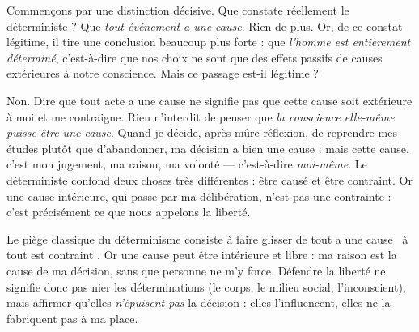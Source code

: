 \documentclass[11pt]{article}
\newcommand{\cle}[1]{{\popxbold\color{popdark}#1}}
\begin{document}
Commençons par une distinction décisive. Que constate réellement le déterministe ? Que \emph{tout événement a une cause}. Rien de plus. Or, de ce constat légitime, il tire une conclusion beaucoup plus forte : que \emph{l'homme est entièrement déterminé}, c'est-à-dire que nos choix ne sont que des effets passifs de causes extérieures à notre conscience. Mais ce passage est-il légitime ?

Non. Dire que tout acte a une cause ne signifie pas que cette cause soit extérieure à moi et me contraigne. Rien n'interdit de penser que \emph{la conscience elle-même puisse être une cause}. Quand je décide, après mûre réflexion, de reprendre mes études plutôt que d'abandonner, ma décision a bien une cause : mais cette cause, c'est mon jugement, ma raison, ma volonté — c'est-à-dire \emph{moi-même}. Le déterministe confond deux choses très différentes : être causé et être contraint. Or une cause intérieure, qui passe par ma délibération, n'est pas une contrainte : c'est précisément ce que nous appelons la \cle{liberté}.

\begin{attention}
Le piège classique du déterminisme consiste à faire glisser de \guillemotleft tout a une cause \guillemotright\ à \guillemotleft tout est contraint \guillemotright. Or une cause peut être intérieure et libre : ma raison est la cause de ma décision, sans que personne ne m'y force. Défendre la liberté ne signifie donc pas nier les déterminations (le corps, le milieu social, l'inconscient), mais affirmer qu'elles \emph{n'épuisent pas} la décision : elles l'influencent, elles ne la fabriquent pas à ma place.
\end{attention}
\end{document}
